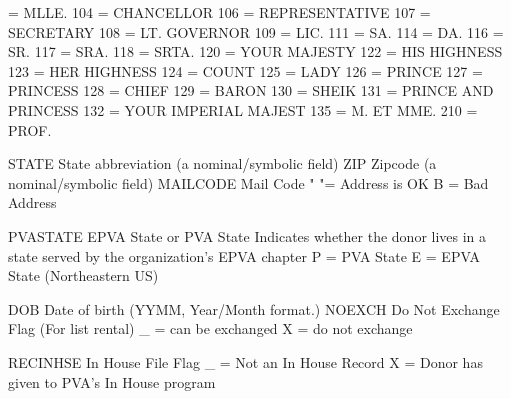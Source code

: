 \documentclass[
  11pt,
  a4paper,
  DIV=12,captions=tableheading,oneside,titlepage]{scrbook}
\let\oldverbatim\verbatim
\let\endoldverbatim\endverbatim
\renewenvironment{verbatim}{\footnotesize\oldverbatim}{\endoldverbatim}
\begin{document}
\begin{verbatim}
                            103    = MLLE.                 
                            104    = CHANCELLOR            
                            106    = REPRESENTATIVE        
                            107    = SECRETARY             
                            108    = LT. GOVERNOR          
                            109    = LIC.                  
                            111    = SA.                   
                            114    = DA.                   
                            116    = SR.                   
                            117    = SRA.                  
                            118    = SRTA.                 
                            120    = YOUR MAJESTY          
                            122    = HIS HIGHNESS          
                            123    = HER HIGHNESS          
                            124    = COUNT                 
                            125    = LADY                  
                            126    = PRINCE                
                            127    = PRINCESS              
                            128    = CHIEF                 
                            129    = BARON                 
                            130    = SHEIK                 
                            131    = PRINCE AND PRINCESS   
                            132    = YOUR IMPERIAL MAJEST  
                            135    = M. ET MME.            
                            210    = PROF.                 
                            
STATE                       State abbreviation (a nominal/symbolic field)
ZIP                         Zipcode (a nominal/symbolic field)
MAILCODE                    Mail Code
                            " "= Address is OK
                            B = Bad Address
                           
PVASTATE                    EPVA State or PVA State
                            Indicates whether the donor lives in a state 
                            served by the organization's EPVA chapter
                            P = PVA State
                            E = EPVA State (Northeastern US)
                           
DOB                         Date of birth (YYMM, Year/Month format.)
NOEXCH                      Do Not Exchange Flag (For list rental)
                            _ = can be exchanged
                            X = do not exchange
                           
RECINHSE                    In House File Flag
                            _ = Not an In House Record
                            X = Donor has given to PVA's In House program
                           

\end{verbatim}
\end{document}
